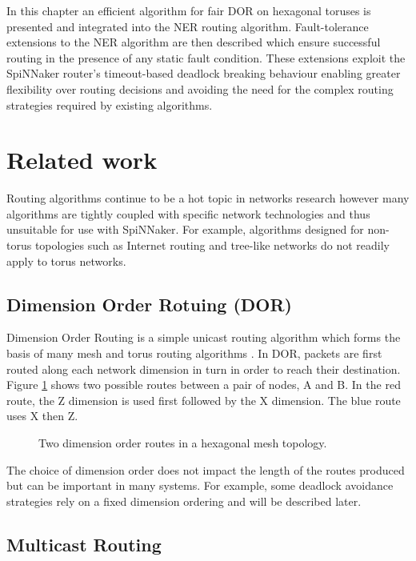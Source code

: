 	In this chapter an efficient algorithm for fair DOR on hexagonal toruses is
	presented and integrated into the NER routing algorithm. Fault-tolerance
	extensions to the NER algorithm are then described which ensure successful
	routing in the presence of any static fault condition. These extensions
	exploit the SpiNNaker router's timeout-based deadlock breaking behaviour
	enabling greater flexibility over routing decisions and avoiding the need for
	the complex routing strategies required by existing algorithms.
	
	\section{Related work}
		
		Routing algorithms continue to be a hot topic in networks research however
		many algorithms are tightly coupled with specific network technologies and
		thus unsuitable for use with SpiNNaker. For example, algorithms designed
		for non-torus topologies such as Internet routing and tree-like networks
		do not readily apply to torus networks.
		
		\subsection{Dimension Order Rotuing (DOR)}
			
			Dimension Order Routing is a simple unicast routing algorithm which forms
			the basis of many mesh and torus routing algorithms \cite{dally04}. In
			DOR, packets are first routed along each network dimension in turn in
			order to reach their destination. Figure \ref{fig:dimensionOrderRouting}
			shows two possible routes between a pair of nodes, A and B. In the red
			route, the Z dimension is used first followed by the X dimension. The
			blue route uses X then Z.
			
			\begin{figure}
				\center
				
				
				\caption{Two dimension order routes in a hexagonal mesh topology.}
				\label{fig:dimensionOrderRouting}
			\end{figure}
			
			The choice of dimension order does not impact the length of the routes
			produced but can be important in many systems. For example, some deadlock
			avoidance strategies rely on a fixed dimension ordering and will be
			described later.
			
		\subsection{Multicast Routing}
			

